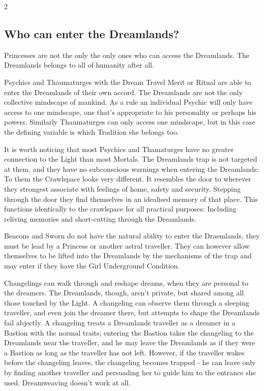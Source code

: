 \begin{multicols}{2}
\bigsidebarstart

\subsection*{Who can enter the Dreamlands?}

Princesses are not the only the only ones who can access the Dreamlands. The Dreamlands belongs to all of humanity after all.



Psychics and Thaumaturges with the Dream Travel Merit or Ritual are able to enter the Dreamlands of their own accord. The Dreamlands are not the only collective mindscape of mankind. As a rule an individual Psychic will only have access to one mindscape, one that's appropriate to his personality or perhaps his powers. Similarly Thaumaturges can only access one mindscape, but in this case the defining variable is which Tradition she belongs too.



It is worth noticing that most Psychics and Thamaturges have no greater connection to the Light than most Mortals. The Dreamlands trap is not targeted at them, and they have no subconscious warnings when entering the Dreamlands: To them the Crawlspace looks very different. It resembles the door to wherever they strongest associate with feelings of home, safety and security. Stepping through the door they find themselves in an idealised memory of that place. This functions identically to the crawlspace for all practical purposes: Including reliving memories and short-cutting through the Dreamlands.



Beacons and Sworn do not have the natural ability to enter the Draemlands, they must be lead by a Princess or another astral traveller. They can however allow themselves to be lifted into the Dreamlands by the mechanisms of the trap and may enter if they have the Girl Underground Condition.



Changelings can walk through and reshape dreams, when they are personal to the dreamers. The Dreamlands, though, aren’t private, but shared among all those touched by the Light. A changeling can observe them through a sleeping traveller, and even join the dreamer there, but attempts to shape the Dreamlands fail abjectly. A changeling treats a Dreamlands traveller as a dreamer in a Bastion with the normal traits; entering the Bastion takes the changeling to the Dreamlands near the traveller, and he may leave the Dreamlands as if they were a Bastion as long as the traveller has not left. However, if the traveller wakes before the changeling leaves, the changeling becomes trapped - he can leave only by finding another traveller and persuading her to guide him to the entrance she used. Dreamweaving doesn’t work at all.




\end{multicols}
